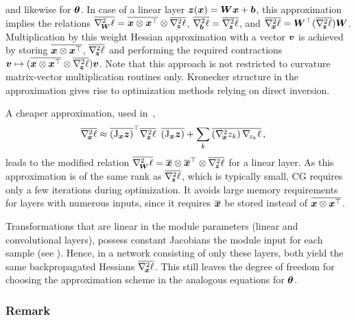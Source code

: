 and likewise for ${\bm{\theta}}$. In case of a linear layer ${\bm{z}}({\bm{x}}) = {\bm{W}}{\bm{x}} + {\bm{b}}$, this
approximation implies the relations $\overline{ \nabla_{\!{{\bm{W}}}}^{2}\ell } = \overline{ {\bm{x}} \otimes
  {\bm{x}}^\top } \otimes \overline{ \nabla_{\!{{\bm{z}}}}^{2}\ell  }$, $\overline{ \nabla_{\!{{\bm{b}}}}^{2}\ell } = \overline{ \nabla_{\!{{\bm{z}}}}^{2}\ell }$, and $\overline{ \nabla_{\!{{\bm{x}}}}^{2} \ell } = {\bm{W}}^\top (\overline{ \nabla_{\!{{\bm{z}}}}^{2}\ell  }) {\bm{W}}$. Multiplication
by this weight Hessian approximation with a vector ${\bm{v}}$ is achieved by storing
$\overline{  {\bm{x}} \otimes {\bm{x}}^\top }$, $\overline{ \nabla_{\!{{\bm{z}}}}^{2}\ell  }$ and performing the required
contractions ${\bm{v}}\mapsto (\overline{ {\bm{x}} \otimes {\bm{x}}^\top } \otimes \overline{ \nabla_{\!{{\bm{z}}}}^{2}\ell  }) {\bm{v}}
$. Note that this approach is not restricted to curvature matrix-vector
multiplication routines only. Kronecker structure in the approximation gives
rise to optimization methods relying on direct inversion.

A cheaper approximation, used in~\citet{wei2018bdapch},
\begin{align}
  \label{hbp::equ:hessians_batch_average_approximation}
  \overline{ \nabla_{\!{{\bm{x}}}}^{2} \ell }
  &\approx
    \overline{ \left(\mathrm{J}_{{\bm{x}}}{\bm{z}}\right) }^\top
    \overline{ \nabla_{\!{{\bm{z}}}}^{2}\ell  }\ \,
    \overline{ \left(\mathrm{J}_{{\bm{x}}}{\bm{z}}\right) }
    + \sum_k \overline{ \left(\nabla_{\!{{\bm{x}}}}^{2}z_k\right) \nabla_{\!{z_{k}}}\ell }\,,
\end{align}
leads to the modified relation $\overline{ \nabla_{\!{{\bm{W}}}}^{2}\ell } = \overline{ {\bm{x}} } \otimes
\overline{ {\bm{x}} }^\top \otimes \overline{ \nabla_{\!{{\bm{z}}}}^{2}\ell  }$ for a linear layer. As this
approximation is of the same rank as $\overline{ \nabla_{\!{{\bm{z}}}}^{2}\ell  }$, which is typically
small, CG requires only a few iterations during optimization. It avoids large
memory requirements for layers with numerous inputs, since it requires
$\overline{ {\bm{x}} }$ be stored instead of $\overline{ {\bm{x}}\otimes {\bm{x}}^\top }$.

Transformations that are linear in the module parameters (\eg linear and
convolutional layers), possess constant Jacobians \wrt the module input for each
sample (see ). Hence, in a network consisting
of only these layers, both
yield the same backpropagated Hessians $\overline{ \nabla_{\!{{\bm{x}}}}^{2} \ell }$. This
still leaves the degree of freedom for choosing the approximation scheme in the
analogous equations for ${\bm{\theta}}$.

\subsubsection{Remark}

